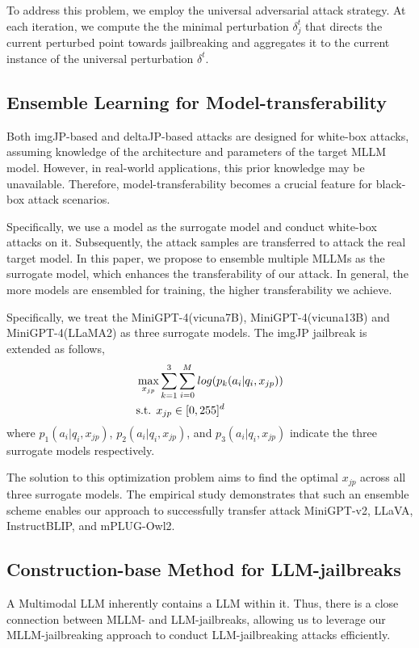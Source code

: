 To address this problem, we employ the universal adversarial attack strategy. At each iteration, we compute the the minimal perturbation $\delta_j^t$
that directs the current perturbed point towards jailbreaking and aggregates it to the current instance of the universal perturbation $\delta^t$. 

\subsection{Ensemble Learning for Model-transferability}
Both imgJP-based and deltaJP-based attacks are designed for white-box attacks, assuming knowledge of the architecture and parameters of the target MLLM model. However, in real-world applications, this prior knowledge may be unavailable. Therefore, model-transferability becomes a crucial feature for black-box attack scenarios.

Specifically, we use a model as the surrogate model and conduct white-box attacks on it. Subsequently, the attack samples are transferred to attack the real target model. In this paper, we propose to ensemble multiple MLLMs as the surrogate model, which enhances the transferability of our attack. In general, the more models are ensembled for training, the higher transferability we achieve.

Specifically, we treat the MiniGPT-4(vicuna7B), MiniGPT-4(vicuna13B) and MiniGPT-4(LLaMA2) as three surrogate models. The imgJP jailbreak is extended as follows,
\begin{align}
    &\mathop{\max}_{x_{jp}} \sum_{k=1}^{3} \sum_{i=0}^{M} log(p_k(a_i| q_i, x_{jp})) \label{eq:em} \\
    &\text{s.t. }  x_{jp} \in [0,255]^d    \notag
\end{align}
where $p_1(a_i| q_i, x_{jp})$, $p_2(a_i| q_i, x_{jp})$, and $p_3(a_i| q_i, x_{jp})$ indicate the three surrogate models respectively. 

The solution to this optimization problem aims to find the optimal $x_{jp}$ across all three surrogate models. The empirical study demonstrates that such an ensemble scheme enables our approach to successfully transfer attack MiniGPT-v2, LLaVA, InstructBLIP, and mPLUG-Owl2. 

\subsection{Construction-base Method for LLM-jailbreaks}

A Multimodal LLM inherently contains a LLM within it. Thus, there is a close connection between MLLM- and LLM-jailbreaks, allowing us to leverage our MLLM-jailbreaking approach to conduct LLM-jailbreaking attacks efficiently.

